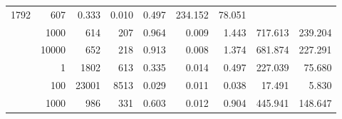 \begin{table}
\begin{tabular}{rrrrrrrrr}
						
							    
							     1792  & 607  
	                           & 0.333 & 0.010 & 0.497
	                           & 234.152 & 78.051  \\
	                
	            
					 &  
					 
					\multirow{ 1 }{*}{ 1000 } &
					
						
							    
							     614  & 207  
	                           & 0.964 & 0.009 & 1.443
	                           & 717.613 & 239.204  \\
	                
	            
					 &  
					 
					\multirow{ 1 }{*}{ 10000 } &
					
						
							    
							     652  & 218  
	                           & 0.913 & 0.008 & 1.374
	                           & 681.874 & 227.291  \\
	                
	            
	        
				\noalign{\smallskip}\hline
				\multirow{ 4 }{*}{ 160000 } &
				
					
					 
					\multirow{ 1 }{*}{ 1 } &
					
						
							    
							     1802  & 613  
	                           & 0.335 & 0.014 & 0.497
	                           & 227.039 & 75.680  \\
	                
	            
					 &  
					 
					\multirow{ 1 }{*}{ 100 } &
					
						
							    
							     23001  & 8513  
	                           & 0.029 & 0.011 & 0.038
	                           & 17.491 & 5.830  \\
	                
	            
					 &  
					 
					\multirow{ 1 }{*}{ 1000 } &
					
						
							    
							     986  & 331  
	                           & 0.603 & 0.012 & 0.904
	                           & 445.941 & 148.647  \\
	                

\end{tabular}
\end{table}
